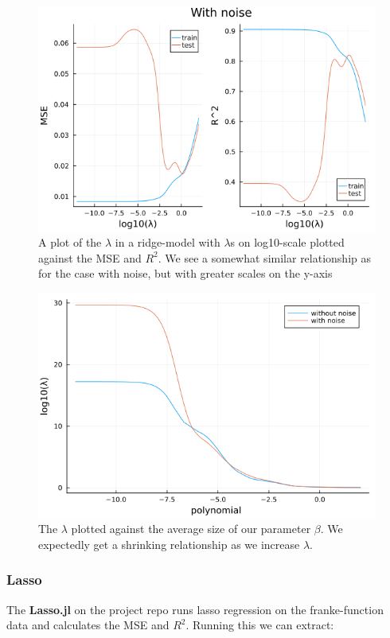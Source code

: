 \documentclass{article}
\begin{document}
\begin{figure}
    \centerline{\includegraphics[scale=0.5]{ridge_with_noise}}
    \caption{A plot of the $\lambda$ in a ridge-model with $\lambda$s on log10-scale plotted against the MSE and $R^2$. We see a somewhat similar relationship as for the case with noise, but with greater scales on the y-axis}
    \label{Ridge-no-noise}
\end{figure}

\begin{figure}
    \centerline{\includegraphics[scale=0.5]{ridge_beta_size}}
    \caption{The $\lambda$ plotted against the average size of our parameter $\beta$. We expectedly get a shrinking relationship as we increase $\lambda$.}
    \label{Ridge-beta-sizes}
\end{figure}

\subsubsection{Lasso}
The \textbf{Lasso.jl} on the project repo \cite{githubrepoproject1} runs lasso
regression on the franke-function data and calculates the MSE and $R^2$. Running
this we can extract:
\end{document}

